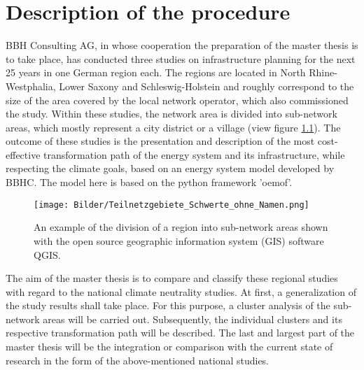 \chapter{Description of the procedure}

BBH Consulting AG, in whose cooperation the preparation of the master thesis is to take place, has conducted three studies on infrastructure planning for the next 25 years in one German region each. The regions are located in North Rhine-Westphalia, Lower Saxony and Schleswig-Holstein and roughly correspond to the size of the area covered by the local network operator, which also commissioned the study. Within these studies, the network area is divided into sub-network areas, which mostly represent a city district or a village (view figure \ref{fig:TNG}). The outcome of these studies is the presentation and description of the most cost-effective transformation path of the energy system and its infrastructure, while respecting the climate goals, based on an energy system model developed by BBHC. The model here is based on the python framework 'oemof'. 

\begin{figure}[htbp]
    \centering
    \texttt{[image: Bilder/Teilnetzgebiete\_Schwerte\_ohne\_Namen.png]}
    \caption{An example of the division of a region into sub-network areas shown with the open source geographic information system (GIS) software QGIS.}
    \label{fig:TNG}
\end{figure}

The aim of the master thesis is to compare and classify these regional studies with regard to the national climate neutrality studies. 
At first, a generalization of the study results shall take place. For this purpose, a cluster analysis of the sub-network areas will be carried out. Subsequently, the individual clusters and its respective transformation path will be described.
The last and largest part of the master thesis will be the integration or comparison with the current state of research in the form of the above-mentioned national studies.